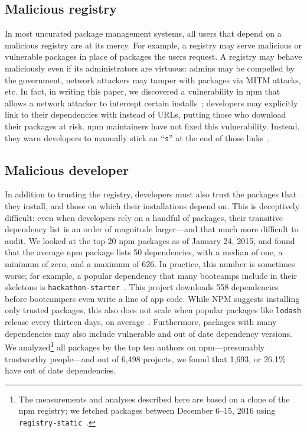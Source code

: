 \subsection{Malicious registry}
In most uncurated package management systems, all users that depend on a
malicious registry are at its mercy. For example, a registry may
serve malicious or vulnerable packages in place of 
packages the users request. A registry may behave maliciously
even if its administrators are virtuous: admins may be
compelled by the government, network attackers may tamper with
packages via MITM attacks, etc. In fact, in writing this paper, we discovered a
vulnerability in npm that allows a network attacker to intercept
certain installs~\cite{shrink}; developers may explicitly link to their dependencies with
\http instead of \https URLs, putting those who
download their packages at risk. npm maintainers have
not fixed this vulnerability. Instead, they warn developers to manually
stick an ``\texttt{s}'' at the end of those links~\cite{shrink-response}.

\subsection{Malicious developer} %
In addition to trusting the registry, developers must also trust the packages
that they install, and those on which their installations depend on. This is
deceptively difficult: even when developers rely on a handful of packages,
their transitive dependency list is an order of magnitude larger---and that
much more difficult to audit. 
We looked at the top 20 npm packages as of January 24, 2015, and found that
the average npm package lists 50 dependencies, with a median of one, a minimum
of zero, and a maximum of 626. 
In practice, this number is sometimes worse; for example, a popular dependency
that many bootcamps include in their skeletons is
\texttt{hackathon-starter}~\cite{hackathon-starter}.
This project downloads 558 dependencies before bootcampers even write a line of app
code.
While NPM suggests installing only trusted packages, this also does not scale
when popular packages like \texttt{lodash} release every thirteen
days, on average~\cite{npm-package-install, staicu2016understanding}.
Furthermore, packages with many dependencies may also include vulnerable
and out of date dependency versions. We analyzed\footnote{
  The measurements and analyses described here are based on a clone of
  the npm registry; we fetched packages between December 6--15, 2016 using
  \texttt{registry-static}~\cite{registry-static}.} all packages by the top ten
authors on npm---presumably trustworthy people---and out of 6,498 projects,
we found that 1,693, or 26.1\% have out of date dependencies.

